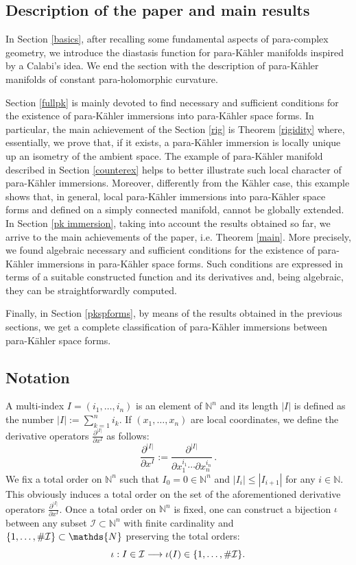 \documentclass{article}
\newcommand{\I}{\mathcal{I}}
\newcommand{\de}{\partial}
\newcommand{\pk}{para-K\"ahler }
\newcommand{\N}{\mathds{N}}
\begin{document}
\subsection{Description of the paper and main results}

In Section \ref{basics}, after recalling some fundamental aspects of para-complex geometry, we introduce the diastasis function for \pk manifolds inspired by a Calabi's idea. We end the section with the description of \pk manifolds of constant para-holomorphic curvature.

Section \ref{fullpk} is mainly devoted to find necessary and sufficient conditions for the existence of  \pk immersions into \pk space forms. In particular, the main achievement of the Section \ref{rig} is Theorem \ref{rigidity} where, essentially, we prove that, if it exists, a \pk immersion is locally unique up an isometry of the ambient space. The example of \pk manifold described in Section \ref{counterex} helps to better illustrate  such local character of \pk immersions. Moreover, differently from the  K\"ahler case, this example shows that, in general, local \pk immersions into \pk space forms and defined on a simply connected manifold, cannot  be globally extended. In Section \ref{pk immersion}, taking into account the results obtained so far, we  arrive to the main achievements of the paper, i.e. Theorem \ref{main}. More precisely, we found algebraic necessary and sufficient conditions for the existence of \pk immersions in \pk space forms. Such conditions are expressed in terms of a suitable constructed function and its derivatives and, being algebraic, they  can  be straightforwardly computed.


Finally, in Section \ref{pkspforms}, by means of the results  obtained in the previous sections, we get a complete classification of \pk immersions between \pk space forms.



\subsection*{Notation}
A multi-index $I=(i_1,\dots,i_n)$ is an element of $\N^n$ and its length $|I|$ is defined as the number $|I|:=\sum_{k=1}^ni_k$.  If $(x_1,\dots,x_n)$ are local coordinates, we define the
derivative operators $\frac{\de^{|I|}}{\de x^I}$ as follows:
$$
\frac{\de^{|I|}}{\de x^I}:=\frac{\de^{|I|}}{\de x_1^{i_1}\cdots \de x_n^{i_n}}\,.
$$
We fix a total order on $\N^n$ such that $I_0=0\in\N^n$ and  $|I_i|\leq|I_{i+1}|$ for any $i\in\N$. This obviously induces a total order on the set of the aforementioned derivative operators $\frac{\de^{|I|}}{\de x^I}$. Once a total order on $\N^n$ is fixed, one can construct a bijection  $\iota$ between any subset $\I\subset\N^n$ with finite cardinality and $\{1,\mathellipsis, \#\I\}\subset\N$ preserving the total orders:
\begin{equation}\label{iota}
\iota :I\in\I\longrightarrow \iota(I)\in\{1,\mathellipsis, \#\I\}.
\end{equation}
\end{document}

